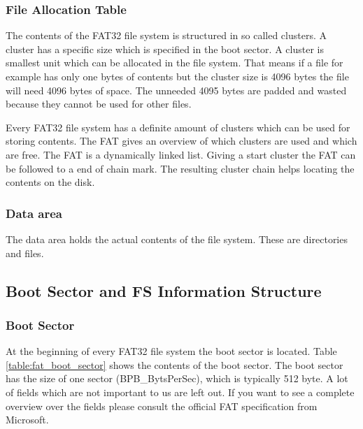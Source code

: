 \subsubsection{File Allocation Table}

The contents of the FAT32 file system is structured in so called clusters. A cluster has a specific size which is specified in the boot sector. A cluster is smallest unit which can be allocated in the file system. That means if a file for example has only one bytes of contents but the cluster size is 4096 bytes the file will need 4096 bytes of space. The unneeded 4095 bytes are padded and wasted because they cannot be used for other files.

Every FAT32 file system has a definite amount of clusters which can be used for storing contents. The FAT gives an overview of which clusters are used and which are free. The FAT is a dynamically linked list. Giving a start cluster the FAT can be followed to a end of chain mark. The resulting cluster chain helps locating the contents on the disk.

\subsubsection{Data area}

The data area holds the actual contents of the file system. These are directories and files.

\subsection{Boot Sector and FS Information Structure}

\subsubsection{Boot Sector}

At the beginning of every FAT32 file system the boot sector is located. Table \ref{table:fat_boot_sector} shows the contents of the boot sector. The boot sector has the size of one sector (BPB\_BytsPerSec), which is typically 512 byte. A lot of fields which are not important to us are left out. If you want to see a complete overview over the fields please consult the official FAT specification from Microsoft\cite{fatgen103}.

